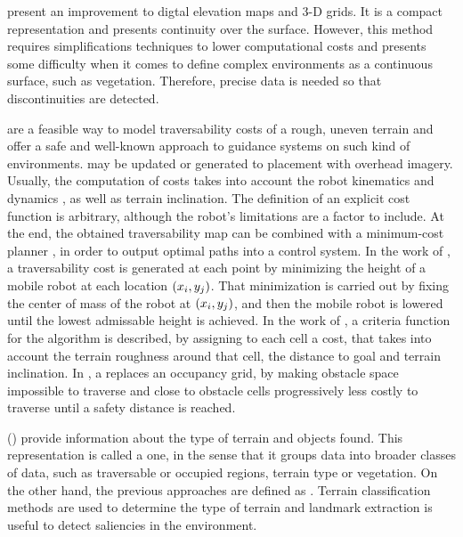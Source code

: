  present an improvement to digtal elevation maps and 3-D grids. It is a compact representation and presents continuity over the surface. However, this method requires simplifications techniques to lower computational costs and presents some difficulty when it comes to define complex environments as a continuous surface, such as vegetation. Therefore, precise data is needed so that discontinuities are detected.

 are a feasible way to model traversability costs of a rough, uneven terrain and offer a safe and well-known approach to guidance systems on such kind of environments.  may be updated  or generated  to placement with overhead imagery. Usually, the computation of costs takes into account the robot kinematics \cite{Amorim2014} and dynamics \cite{Yokokohji2007}, as well as terrain inclination. The definition of an explicit cost function is arbitrary, although the robot's limitations are a factor to include. At the end, the obtained traversability map can be combined with a minimum-cost planner \cite{Amorim2014, Ishigami2007PathPlanning}, in order to output optimal paths into a control system. In the work of \citet{Amorim2014}, a traversability cost is generated at each point by minimizing the height of a mobile robot at each location $(x_i, y_j)$. That minimization is carried out by fixing the center of mass of the robot at $(x_i, y_j)$, and then the mobile robot is lowered until the lowest admissable height is achieved. In the work of \citet{Ishigami2007PathPlanning}, a criteria function for the  algorithm is described, by assigning to each cell a cost, that takes into account the terrain roughness around that cell, the distance to goal and terrain inclination. In \cite{Ventura2015}, a  replaces an occupancy grid, by making obstacle space impossible to traverse and close to obstacle cells progressively less costly to traverse until a safety distance is reached.

 () provide information about the type of terrain and objects found. This representation is called a  one, in the sense that it groups data into broader classes of data, such as traversable or occupied regions, terrain type or vegetation. On the other hand, the previous approaches are defined as . Terrain classification methods \cite{Brooks2012self} are used to determine the type of terrain and landmark extraction is useful to detect saliencies in the environment.

